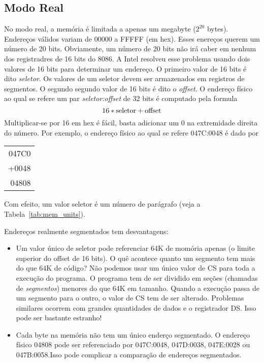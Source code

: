 
\subsection{Modo Real \label{real_mode} }

No  modo real, a memória é limitada a apenas um megabyte ($2^{20}$ bytes).
Endereços válidos variam de 00000 a FFFFF (em hex).\@ %
Esses enereços querem um número de 20 bits. Obviamente, um número de 20 bits 
não irá caber em nenhum dos registradres de 16 bits do 8086. A Intel resolveu 
esse problema usando dois valores de 16 bits para determinar um endereço. O 
primeiro valor de 16 bits é dito \emph{seletor}. Os valores de um seletor 
devem ser armazenados em registros de segmentos. O segundo segundo valor de 
16 bits é dito o \emph{offset}. O endereço físico ao qual se refere um par 
\emph{seletor:offset} de 32 bits é computado pela formula
\[ 16 * {\rm seletor} + {\rm offset} \]
Multiplicar-se por 16 em hex é fácil, basta adicionar um 0 na extremidade 
direita do número. Por exemplo, o endereço físico ao qual se refere 
047C:0048 é dado por
\begin{center}
\begin{tabular}{r}
047C0 \\
+0048 \\
\hline
04808 \\
\end{tabular}
\end{center}
Com efeito, um valor seletor é um número de parágrafo
(veja a Tabela~\ref{tab:mem_units}).

Endereços realmente segmentados tem desvantagens:
\begin{itemize}
\item Um valor único de seletor pode referenciar 64K de momória apenas (o 
limite superior do offset de 16 bits). O quê acontece quanto um segmento tem 
mais do que 64K de código? Não podemos usar um único valor de CS para toda a 
execução do programa. O programa tem de ser dividido em seções (chamadas de 
\emph{segmentos}) menores do que 64K em tamanho. Quando 
a execução passa de um segmento para o outro, o valor de CS tem de ser
alterado. Problemas similares ocorrem com grandes quantidades de dados e o
registrador DS. Isso pode ser bastante estranho!

\item Cada byte na memória não tem um único enderço segmentado. O endereço
físico 04808 pode ser referenciado por 047C:0048, 047D:0038, 047E:0028 ou
047B:0058.\@ Isso pode complicar a comparação de endereços segmentados.

\end{itemize}

